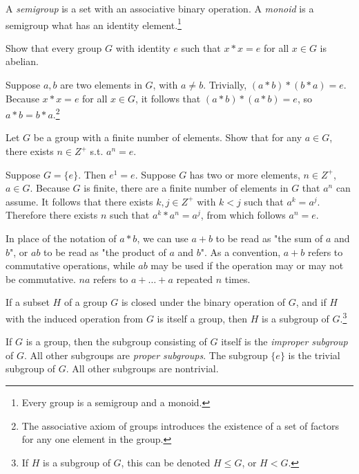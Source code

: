 \documentclass[nobib,notoc]{tufte-handout}
\begin{document}
\begin{defi}
	A \emph{semigroup} is a set with an associative binary operation. A \emph{monoid} is a semigroup what has an identity element.\footnote{Every group is a semigroup and a monoid.}
\end{defi}
\begin{prob}{1}
	Show that every group \(G\) with identity \(e\) such that \(x*x=e\) for all \(x\in G\) is abelian.
	\begin{IEEEproof}
		Suppose \(a,b\) are two elements in \(G\), with \(a\neq b\). Trivially, \((a*b)*(b*a)=e\). Because \(x*x=e\) for all \(x\in G\), it follows that \((a*b)*(a*b)=e\), so \(a*b=b*a\).\footnote{The associative axiom of groups introduces the existence of a set of factors for any one element in the group.}
	\end{IEEEproof}
\end{prob}
\begin{prob}{2}
	Let \(G\) be a group with a finite number of elements. Show that for any \(a\in G\), there exists \(n\in Z^+\) s.t. \(a^n=e\).
	\begin{IEEEproof}
		Suppose \(G=\{e\}\). Then \(e^1=e\). Suppose \(G\) has two or more elements, \(n\in Z^+\), \(a\in G\). Because \(G\) is finite, there are a finite number of elements in \(G\) that \(a^n\) can assume. It follows that there exists \(k,j\in Z^+\) with \(k<j\) such that \(a^k=a^j\). Therefore there exists \(n\) such that \(a^k*a^n=a^j\), from which follows \(a^n=e\).
	\end{IEEEproof}
\end{prob}
\begin{notat}
	In place of the notation of \(a*b\), we can use \(a+b\) to be read as "the sum of \(a\) and \(b\)", or \(ab\) to be read as "the product of \(a\) and \(b\)". As a convention, \(a+b\) refers to commutative operations, while \(ab\) may be used if the operation may or may not be commutative. \(na\) refers to \(a+\ldots+a\) repeated \(n\) times.
\end{notat}
\begin{defi}[Subgroup]
	If a subset \(H\) of a group \(G\) is closed under the binary operation of \(G\), and if \(H\) with the induced operation from \(G\) is itself a group, then \(H\) is a subgroup of \(G\).\footnote{If \(H\) is a subgroup of \(G\), this can be denoted \(H\leq G\), or \(H<G\).}
\end{defi}
\begin{defi}
	If \(G\) is a group, then the subgroup consisting of \(G\) itself is the \emph{improper subgroup} of \(G\). All other subgroups are \emph{proper subgroups}. The subgroup \(\{e\}\) is the trivial subgroup of \(G\). All other subgroups are nontrivial.
\end{defi}
\end{document}
